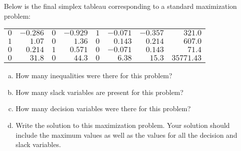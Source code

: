 \documentclass[11pt,letterpaper]{article}
\begin{document}
 Below is the final simplex tableau corresponding to a standard maximization problem:
	\begin{table}[!ht]
	\centering
	\begin{tabular}{rrrrrrr|r}
	$0$ & $-0.286$ & $0$ & $-0.929$ & $1$ & $-0.071$ & $-0.357$ & $321.0$ \\
	$1$ & $1.07$ & $0$ & $1.36$ & $0$ & $0.143$ & $0.214$ & $607.0$ \\
	$0$ & $0.214$ & $1$ & $0.571$ & $0$ & $-0.071$ & $0.143$ & $71.4$ \\ \hline
	$0$ & $31.8$ & $0$ & $44.3$ & $0$ & $6.38$ & $15.3$ & $35771.43$
	\end{tabular}
	\end{table} 
\begin{enumerate}[(a)]
\item How many inequalities were there for this problem?
\item How many slack variables are present for this problem?
\item How many decision variables were there for this problem?
\item Write the solution to this maximization problem. Your solution should include the maximum values as well as the values for all the decision and slack variables.
\end{enumerate}
\end{document}
